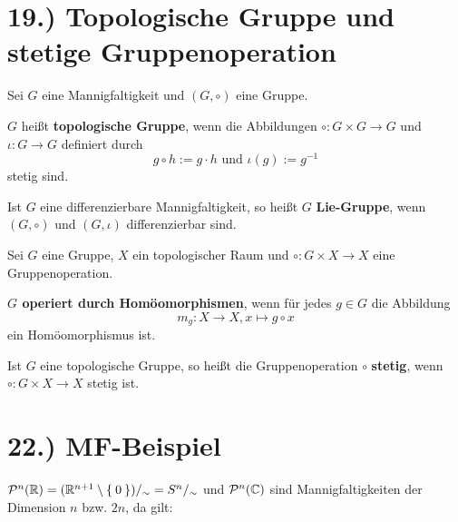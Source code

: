 \documentclass[a5paper,oneside]{scrbook}
\begin{document}
\section*{19.) Topologische Gruppe und stetige Gruppenoperation}
\begin{definition}%
    Sei $G$ eine Mannigfaltigkeit und $(G, \circ)$ eine Gruppe.

    \begin{defenum}
        \item $G$ heißt \textbf{topologische Gruppe},
              wenn die Abbildungen $\circ: G \times G \rightarrow G$
              und $\iota: G \rightarrow G$ definiert durch
              \[g \circ h := g \cdot h \text{ und } \iota(g) := g^{-1}\]
              stetig sind.
        \item Ist $G$ eine differenzierbare Mannigfaltigkeit, so heißt
              $G$ \textbf{Lie-Gruppe}, wenn
              $(G, \circ)$ und $(G, \iota)$ differenzierbar sind.
    \end{defenum}
\end{definition}

\begin{definition}
    Sei $G$ eine Gruppe, $X$ ein topologischer Raum und
    $\circ: G \times X \rightarrow X$ eine Gruppenoperation.

    \begin{defenum}
        \item {}\textbf{$G$ operiert durch Homöomorphismen}, wenn für jedes $g \in G$
              die Abbildung
              \[m_g: X \rightarrow X, x \mapsto g \circ x\]
              ein Homöomorphismus ist.
        \item Ist $G$ eine topologische Gruppe, so heißt die Gruppenoperation $\circ$
              \textbf{stetig}, wenn
              $\circ: G \times X \rightarrow X$ stetig ist.
    \end{defenum}
\end{definition}


\section*{22.) MF-Beispiel}
$\mathcal{P}^n(\mathbb{R}) = (\mathbb{R}^{n+1} \setminus \Set{0})/_\sim = S^n /_\sim$ und $\mathcal{P}^n(\mathbb{C})$ sind Mannigfaltigkeiten
der Dimension $n$ bzw. $2n$, da gilt:
\end{document}
